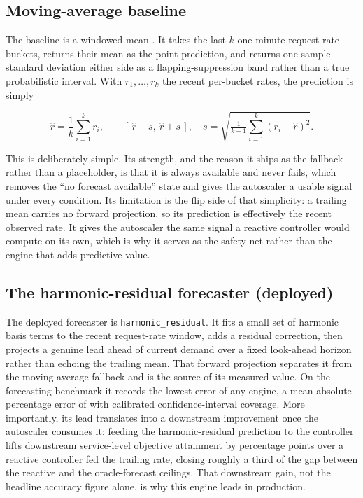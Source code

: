 \subsection{Moving-average baseline}\label{imb:movingavg}

The baseline is a windowed mean \cite{hyndman2021forecasting}. It takes the last
$k$ one-minute request-rate buckets, returns their mean as the point prediction,
and returns one sample standard deviation either side as a flapping-suppression
band rather than a true probabilistic interval. With $r_1, \dots, r_k$ the recent
per-bucket rates, the prediction is simply

\begin{equation}\label{imb:eq:movingavg}
  \hat{r} = \frac{1}{k}\sum_{i=1}^{k} r_i,
  \qquad
  [\,\hat{r}-s,\ \hat{r}+s\,], \quad
  s = \sqrt{\tfrac{1}{k-1}\textstyle\sum_{i=1}^{k}(r_i-\hat{r})^2}.
\end{equation}

This is deliberately simple. Its strength, and the reason it ships as the fallback
rather than a placeholder, is that it is always available and never fails, which
removes the ``no forecast available'' state and gives the autoscaler a usable
signal under every condition. Its limitation is the flip side of that simplicity:
a trailing mean carries no forward projection, so its prediction is effectively
the recent observed rate. It gives the autoscaler the same signal a reactive
controller would compute on its own, which is why it serves as the safety net
rather than the engine that adds predictive value.

\subsection{The harmonic-residual forecaster (deployed)}\label{imb:harmonic}

The deployed forecaster is \texttt{harmonic\_residual}. It fits a small set of
harmonic basis terms to the recent request-rate window, adds a residual
correction, then projects a genuine lead ahead of current demand over a fixed
look-ahead horizon rather than echoing the trailing mean. That forward projection
separates it from the moving-average fallback and is the source of its measured
value. On the forecasting benchmark it records the lowest error of any engine, a
mean absolute percentage error of \BMfcMape{} with calibrated confidence-interval
coverage. More importantly, its lead translates into a downstream improvement once
the autoscaler consumes it: feeding the harmonic-residual prediction to the
controller lifts downstream service-level objective attainment by \BMfcSlaGain{}
percentage points over a reactive controller fed the trailing rate, closing
roughly a third of the gap between the reactive and the oracle-forecast ceilings.
That downstream gain, not the headline accuracy figure alone, is why this engine
leads in production.

